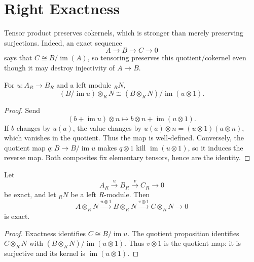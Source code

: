 \section{Right Exactness}\label{sec:tensor-right-exactness}
Tensor product preserves cokernels, which is stronger than merely preserving
surjections.  Indeed, an exact sequence
\[
A\longrightarrow B\longrightarrow C\longrightarrow0
\]
says that \(C\cong B/\operatorname{im}(A)\), so tensoring preserves this
quotient/cokernel even though it may destroy injectivity of \(A\to B\).

\begin{proposition}\label{cor:tensor-quotient}
For \(u:A_R\to B_R\) and a left module \({}_RN\),
\[
(B/\operatorname{im}u)\otimes_RN
\cong(B\otimes_RN)/\operatorname{im}(u\otimes1).
\]
\end{proposition}
\begin{proof}
Send
\[
(b+\operatorname{im}u)\otimes n
\longmapsto b\otimes n+\operatorname{im}(u\otimes1).
\]
If \(b\) changes by \(u(a)\), the value changes by
\(u(a)\otimes n=(u\otimes1)(a\otimes n)\), which vanishes in the quotient.
Thus the map is well-defined. Conversely, the quotient map
\(q:B\to B/\operatorname{im}u\) makes \(q\otimes1\) kill
\(\operatorname{im}(u\otimes1)\), so it induces the reverse map. Both
composites fix elementary tensors, hence are the identity.
\end{proof}

\begin{theorem}\label{thm:tensor-right-exact}
Let
\[
A_R\xrightarrow{u}B_R\xrightarrow{v}C_R\longrightarrow0
\]
be exact, and let \({}_RN\) be a left \(R\)-module. Then
\[
A\otimes_RN\xrightarrow{u\otimes1}
B\otimes_RN\xrightarrow{v\otimes1}
C\otimes_RN\longrightarrow0
\]
is exact.
\end{theorem}
\begin{proof}
Exactness identifies \(C\cong B/\operatorname{im}u\). The quotient
proposition identifies \(C\otimes_RN\) with
\((B\otimes_RN)/\operatorname{im}(u\otimes1)\). Thus \(v\otimes1\) is the
quotient map: it is surjective and its kernel is
\(\operatorname{im}(u\otimes1)\).
\end{proof}

